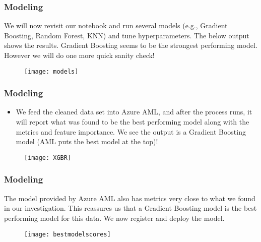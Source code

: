 \documentclass{beamer}
\begin{document}

\begin{frame}

\frametitle{Modeling}

We will now revisit our notebook and run several models (e.g., Gradient Boosting, Random Forest, KNN) and tune hyperparameters. The below output shows the results. Gradient Boosting seems to be the strongest performing model. However we will do one more quick sanity check!

\begin{figure}
\texttt{[image: models]}
\end{figure}

\end{frame}



\begin{frame}

\frametitle{Modeling}

\begin{itemize}

\item We feed the cleaned data set into Azure AML, and after the process runs, it will report what was found to be the best performing model along with the metrics and feature importance. We see the output is a Gradient Boosting model (AML puts the best model at the top)!
\bigskip


\end{itemize}

\begin{figure}
\texttt{[image: XGBR]}
\end{figure}


\end{frame}



\begin{frame}

\frametitle{Modeling}

The model provided by Azure AML also has metrics very close to what we found in our investigation. This reassures us that a Gradient Boosting model is the best performing model for this data. We now register and deploy the model.

\begin{figure}
\texttt{[image: bestmodelscores]}
\end{figure}


\end{frame}
\end{document}
